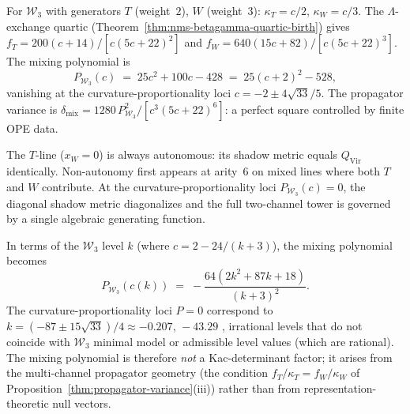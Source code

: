 \begin{example}
\label{ex:w3-mixing-polynomial}
For $\mathcal{W}_3$ with generators $T$ (weight~$2$), $W$ (weight~$3$):
$\kappa_T = c/2$, $\kappa_W = c/3$.
The $\Lambda$-exchange quartic
(Theorem~\ref{thm:nms-betagamma-quartic-birth})
gives
$f_T = 200(c{+}14)/[c(5c{+}22)^2]$ and
$f_W = 640(15c{+}82)/[c(5c{+}22)^3]$.
The mixing polynomial is
\[
  P_{\mathcal{W}_3}(c)
  \;=\; 25c^2 + 100c - 428
  \;=\; 25(c{+}2)^2 - 528,
\]
vanishing at the curvature-proportionality loci
$c = -2 \pm 4\sqrt{33}/5$.
The propagator variance is
$\delta_{\mathrm{mix}} =
1280\,P_{\mathcal{W}_3}^2 / [c^3(5c{+}22)^6]$:
a perfect square controlled by finite OPE data.

The $T$-line ($x_W = 0$) is always autonomous:
its shadow metric equals $Q_{\mathrm{Vir}}$ identically.
Non-autonomy first appears at arity~$6$ on mixed lines
where both $T$ and $W$ contribute.
At the curvature-proportionality loci $P_{\mathcal{W}_3}(c) = 0$,
the diagonal shadow metric diagonalizes and the full
two-channel tower is governed by a single algebraic
generating function.
\end{example}

\begin{remark}
\label{rem:mixing-polynomial-spectral}
In terms of the $\mathcal{W}_3$ level $k$ (where $c = 2 - 24/(k{+}3)$), the mixing polynomial becomes
\[
  P_{\mathcal{W}_3}(c(k))
  \;=\;
  -\frac{64(2k^2 + 87k + 18)}{(k+3)^2}.
\]
The curvature-proportionality loci $P = 0$ correspond to
$k = (-87 \pm 15\sqrt{33})/4 \approx -0.207,\, -43.29$
, irrational levels that do not coincide with
$\mathcal{W}_3$ minimal model or admissible level values
(which are rational).
The mixing polynomial is therefore \emph{not} a Kac-determinant
factor; it arises from the multi-channel propagator geometry
(the condition $f_T/\kappa_T = f_W/\kappa_W$ of
Proposition~\ref{thm:propagator-variance}(iii)) rather than from
representation-theoretic null vectors.
\end{remark}

